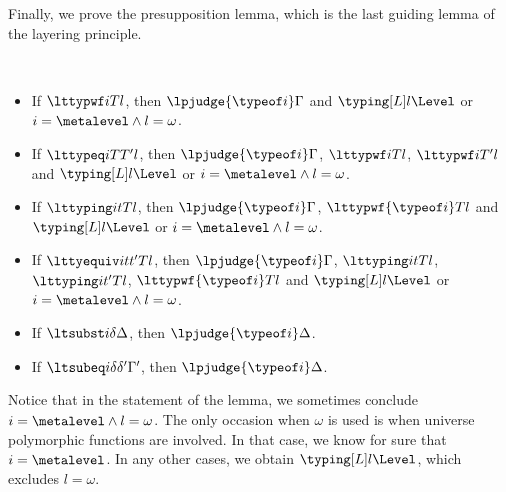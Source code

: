 Finally, we prove the presupposition lemma, which is the last guiding lemma of the
layering principle.
\begin{lemma}[Presupposition] $ $
  \begin{itemize}
  \item If $\lttypwf i T l$, then $\lpjudge{\typeof i}\Gamma$ and $\typing[L]l\Level$ or $i = \metalevel \wedge l = \omega$. 
  \item If $\lttypeq i T{T'} l$, then $\lpjudge{\typeof i}\Gamma$, $\lttypwf i T l$,
    $\lttypwf i{T'}l$ and $\typing[L]l\Level$ or $i = \metalevel \wedge l = \omega$.
  \item If $\lttyping i t T l$, then $\lpjudge{\typeof i}\Gamma$, \newline
    $\lttypwf{\typeof i} T l$ and $\typing[L]l\Level$ or $i = \metalevel \wedge l = \omega$.
  \item If $\lttyequiv i t{t'} T l$, then $\lpjudge{\typeof i}\Gamma$, $\lttyping i t
    T l$, $\lttyping i{t'} T l$, $\lttypwf{\typeof i} T l$
     and $\typing[L]l\Level$ or $i = \metalevel \wedge l = \omega$.
  \item If $\ltsubst i{\delta}{\Delta}$, then $\lpjudge{\typeof i}\Delta$.
  \item If $\ltsubeq i{\delta}{\delta'}{\Gamma'}$, then $\lpjudge{\typeof i}\Delta$.
  \end{itemize}  
\end{lemma}
Notice that in the statement of the lemma, we sometimes conclude $i = \metalevel \wedge l =
\omega$. %
The only occasion when $\omega$ is used is when universe polymorphic functions are
involved. %
In that case, we know for sure that $i = \metalevel$. %
In any other cases, we obtain $\typing[L]l\Level$, which excludes $l = \omega$.
